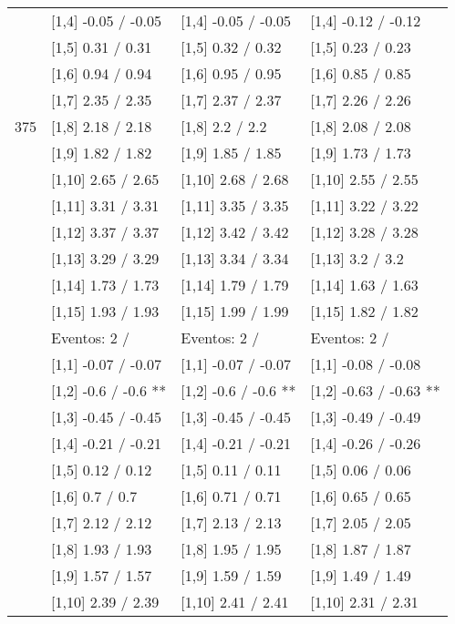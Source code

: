 \begin{table}
\begin{tabular}[t]{llll}
\addlinespace
 & {}[1,4] -0.05  / -0.05 & {}[1,4] -0.05  / -0.05 & {}[1,4] -0.12  / -0.12\\
 & {}[1,5] 0.31  / 0.31 & {}[1,5] 0.32  / 0.32 & {}[1,5] 0.23  / 0.23\\
 & {}[1,6] 0.94  / 0.94 & {}[1,6] 0.95  / 0.95 & {}[1,6] 0.85  / 0.85\\
 & {}[1,7] 2.35  / 2.35 & {}[1,7] 2.37  / 2.37 & {}[1,7] 2.26  / 2.26\\
375 & {}[1,8] 2.18  / 2.18 & {}[1,8] 2.2  / 2.2 & {}[1,8] 2.08  / 2.08\\
\addlinespace
 & {}[1,9] 1.82  / 1.82 & {}[1,9] 1.85  / 1.85 & {}[1,9] 1.73  / 1.73\\
 & {}[1,10] 2.65  / 2.65 & {}[1,10] 2.68  / 2.68 & {}[1,10] 2.55  / 2.55\\
 & {}[1,11] 3.31  / 3.31 & {}[1,11] 3.35  / 3.35 & {}[1,11] 3.22  / 3.22\\
 & {}[1,12] 3.37  / 3.37 & {}[1,12] 3.42  / 3.42 & {}[1,12] 3.28  / 3.28\\
 & {}[1,13] 3.29  / 3.29 & {}[1,13] 3.34  / 3.34 & {}[1,13] 3.2  / 3.2\\
\addlinespace
 & {}[1,14] 1.73  / 1.73 & {}[1,14] 1.79  / 1.79 & {}[1,14] 1.63  / 1.63\\
 & {}[1,15] 1.93  / 1.93 & {}[1,15] 1.99  / 1.99 & {}[1,15] 1.82  / 1.82\\
 & Eventos:  2 / & Eventos:  2 / & Eventos:  2 /\\
 & {}[1,1] -0.07  / -0.07 & {}[1,1] -0.07  / -0.07 & {}[1,1] -0.08  / -0.08\\
 & {}[1,2] -0.6  / -0.6 ** & {}[1,2] -0.6  / -0.6 ** & {}[1,2] -0.63  / -0.63 **\\
\addlinespace
 & {}[1,3] -0.45  / -0.45 & {}[1,3] -0.45  / -0.45 & {}[1,3] -0.49  / -0.49\\
 & {}[1,4] -0.21  / -0.21 & {}[1,4] -0.21  / -0.21 & {}[1,4] -0.26  / -0.26\\
 & {}[1,5] 0.12  / 0.12 & {}[1,5] 0.11  / 0.11 & {}[1,5] 0.06  / 0.06\\
 & {}[1,6] 0.7  / 0.7 & {}[1,6] 0.71  / 0.71 & {}[1,6] 0.65  / 0.65\\
 & {}[1,7] 2.12  / 2.12 & {}[1,7] 2.13  / 2.13 & {}[1,7] 2.05  / 2.05\\
\addlinespace
500 & {}[1,8] 1.93  / 1.93 & {}[1,8] 1.95  / 1.95 & {}[1,8] 1.87  / 1.87\\
 & {}[1,9] 1.57  / 1.57 & {}[1,9] 1.59  / 1.59 & {}[1,9] 1.49  / 1.49\\
 & {}[1,10] 2.39  / 2.39 & {}[1,10] 2.41  / 2.41 & {}[1,10] 2.31  / 2.31\\

\end{tabular}
\end{table}
